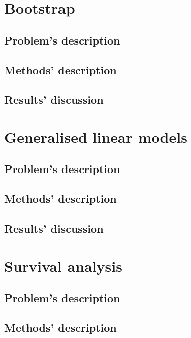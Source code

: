 \documentclass{report}
\begin{document}

\chapter{Bootstrap}
\section{Problem's description}

\section{Methods' description}

\section{Results' discussion}


\chapter{Generalised linear models}
\section{Problem's description}

\section{Methods' description}

\section{Results' discussion}


\chapter{Survival analysis}
\section{Problem's description}

\section{Methods' description}
\end{document}
